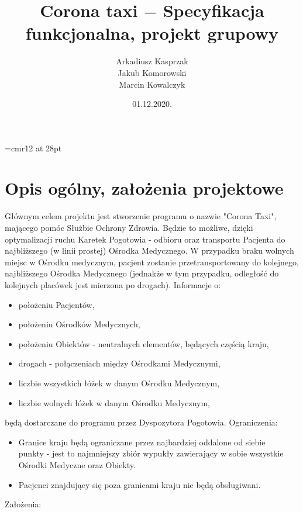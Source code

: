 \documentclass{article}
\begin{document}
\font\myfont=cmr12 at 28pt
\title{\myfont Corona taxi $-$ Specyfikacja funkcjonalna, projekt grupowy}
\author{ \Huge Arkadiusz Kasprzak\\[8pt] \Huge Jakub Komorowski\\[8pt] \Huge Marcin Kowalczyk }
\date{\huge 01.12.2020.}
\maketitle

\thispagestyle{empty}
\newpage

\begin{frame}{}
    \tableofcontents
\end{frame}

\newpage

\section{Opis ogólny, założenia projektowe}
    
    Głównym celem projektu jest stworzenie programu o nazwie "Corona Taxi", mającego pomóc Służbie Ochrony Zdrowia. Będzie to możliwe, dzięki optymalizacji ruchu Karetek Pogotowia - odbioru oraz transportu Pacjenta do najbliższego (w linii prostej) Ośrodka Medycznego. W przypadku braku wolnych miejsc w Ośrodku medycznym, pacjent zostanie przetransportowany do kolejnego, najbliższego Ośrodka Medycznego (jednakże w tym przypadku, odległość do kolejnych placówek jest mierzona po drogach). Informacje o:
    
    \begin{itemize}
        \item położeniu Pacjentów, 
        \item położeniu Ośrodków Medycznych,
        \item położeniu Obiektów - neutralnych elementów, będących częścią kraju,
        \item drogach - połączeniach między Ośrodkami Medycznymi,
        \item liczbie wszystkich łóżek w danym Ośrodku Medycznym,
        \item liczbie wolnych łóżek w danym Ośrodku Medycznym,
    \end{itemize}
    będą dostarczane do programu przez Dyspozytora Pogotowia.
    Ograniczenia:
    
    \begin{itemize}
        \item Granice kraju będą ograniczane przez najbardziej oddalone od siebie \\punkty - jest to najmniejszy zbiór wypukły zawierający w sobie wszystkie Ośrodki Medyczne oraz Obiekty.
        \item Pacjenci znajdujący się poza granicami kraju nie będą obsługiwani.
    \end{itemize}
    Założenia:
    
\end{document}
